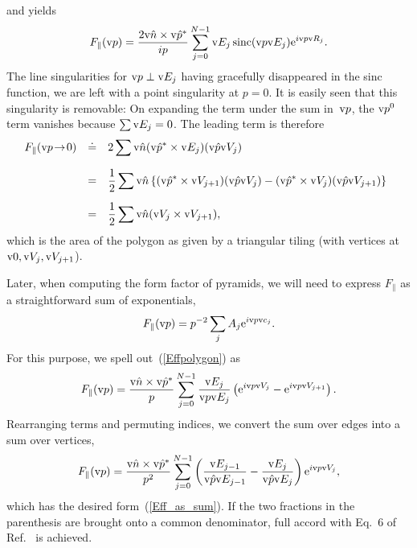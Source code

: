 and yields
\begin{equation}\label{Effpolygon}
    F_\parallel(\text{v}{p})
    = \frac{2\text{v}{\hat n}\times\text{v}{\hat p}^*}{ip} \sum_{j=0}^{N-1} \text{v}{E}_j \operatorname{sinc}(\text{v}{p}\text{v}{E}_j) \text{e}^{i\text{v}{p}\text{v}{R}_j}.
\end{equation}
The line singularities for $\text{v}{p}\perp\text{v}{E}_j$ having gracefully disappeared in the
sinc function,
we are left with a point singularity at $p=0$.
It is easily seen that this singularity is removable:
On expanding the term under the sum in~$\text{v}{p}$,
the $\text{v}{p}^0$ term vanishes because $\sum\text{v}{E}_j=0$.
The leading term is therefore
\begin{equation}
  \begin{array}{@{}lcl}
  F_\parallel(\qp\!\to\!0)
    &\doteq& \displaystyle 2\sum \n(\uqp^*\times\E_j) (\uqp\V_j)\\[3ex]
    &=&\displaystyle \frac{1}{2}\sum \n\left\{
        (\uqp^*\times\V_{j+1})(\uqp\V_j)
      - (\uqp^*\times\V_j)(\uqp\V_{j+1})
      \right\}\\[3ex]
    &=&\displaystyle \frac{1}{2}\sum \n(\V_j\times\V_{j+1}),
  \end{array}
\end{equation}
which is the area of the polygon
as given by a triangular tiling (with vertices at $\text{v}{0},\text{v}{V}_j,\text{v}{V}_{j+1}$).

Later, when computing the form factor of pyramids,
we will need to express $F_\parallel$ as a straightforward sum
of exponentials,
\begin{equation}\label{Eff_as_sum}
  F_\parallel(\text{v}{p})=p^{-2}\sum_j A_j \text{e}^{i\text{v}{p} \text{v}{c}_j}.
\end{equation}
For this purpose,
we spell out~(\ref{Effpolygon}) as
\begin{equation}\label{Effpolygon}
    F_\parallel(\text{v}{p})
    = \frac{\text{v}{\hat n}\times\text{v}{\hat p}^*}{p} \sum_{j=0}^{N-1} \frac{\text{v}{E}_j}{\text{v}{p}\text{v}{E}_j}
       \left(\text{e}^{i\text{v}{p}\text{v}{V}_j}-\text{e}^{i\text{v}{p}\text{v}{V}_{j+1}}\right).
\end{equation}
Rearranging terms and permuting indices,
we convert the sum over edges into a sum over vertices,
\begin{equation}\label{Effpolygon_expsum}
    F_\parallel(\text{v}{p})
    = \frac{\text{v}{\hat n}\times\text{v}{\hat p}^*}{p^2} \sum_{j=0}^{N-1}
       \left( \frac{\text{v}{E}_{j-1}}{\text{v}{\hat p}\text{v}{E}_{j-1}} - \frac{\text{v}{E}_j}{\text{v}{\hat p}\text{v}{E}_j} \right)
       \text{e}^{i\text{v}{p}\text{v}{V}_j},
\end{equation}
which has the desired form~(\ref{Eff_as_sum}).
If the two fractions in the parenthesis are brought onto a common denominator,
full accord with Eq.~6 of Ref.~\cite{LeMi83} is achieved.

